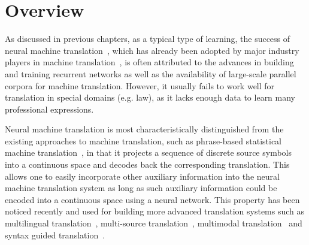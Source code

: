 \section{Overview}

As discussed in previous chapters, as a typical type of \sts learning,
the success of neural machine translation~\citep{bahdanau2014neural}, which has already been adopted by major industry players in machine translation~\citep{wu2016google,crego2016systran,hassan-hp}, is often attributed to the advances in building and training recurrent networks as well as the availability of large-scale parallel corpora for machine translation. However, it usually fails to work well for translation in special domains (e.g. law),  as it lacks enough data to learn many professional expressions.

Neural machine translation is most characteristically distinguished from the existing approaches to machine translation, such as phrase-based statistical machine translation~\citep{koehn2003statistical}, in that it projects a sequence of discrete source symbols into a continuous space and decodes back the corresponding translation. This allows one to easily incorporate other auxiliary information into the neural machine translation system as long as such auxiliary information could be encoded into a continuous space using a neural network. This property has been noticed recently and used for building more advanced translation systems such as multilingual translation~\citep{firat2016multi,luong2015multi}, multi-source translation~\citep{zoph2016multi,firat2016zero}, multimodal translation~\citep{caglayan2016does} and syntax guided translation~\citep{nadejde2017syntax,eriguchi2017learning}. 

